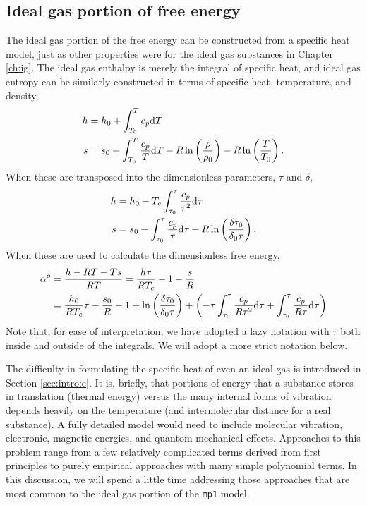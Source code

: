 \subsection{Ideal gas portion of free energy}
The ideal gas portion of the free energy can be constructed from a specific heat model, just as other properties were for the ideal gas substances in Chapter \ref{ch:ig}.  The ideal gas enthalpy is merely the integral of specific heat, and ideal gas entropy can be similarly constructed in terms of specific heat, temperature, and density,
\begin{subequations}
\begin{align}
h &= h_0 + \int_{T_0}^T c_p \mathrm{d} T\\
s &= s_0 + \int_{T_0}^T \frac{c_p}{T} \mathrm{d} T - R \ln\left(\frac{\rho}{\rho_0}\right) - R\ln\left(\frac{T}{T_0}\right).
\end{align}
\end{subequations}
When these are transposed into the dimensionless parameters, $\tau$ and $\delta$,
\begin{align*}
h &= h_0 - T_c \int_{\tau_0}^\tau \frac{c_p}{\tau^2} \mathrm{d} \tau\\
s &= s_0 - \int_{\tau_0}^\tau \frac{c_p}{\tau} \mathrm{d} \tau - R \ln\left(\frac{\delta \tau_0}{\delta_0 \tau}\right).
\end{align*}
When these are used to calculate the dimensionless free energy,
\begin{align}
\alpha^o &= \frac{h - RT - Ts}{RT} = \frac{h \tau}{R T_c} - 1 - \frac{s}{R}\nonumber\\
 &= \frac{h_0}{RT_c} \tau - \frac{s_0}{R} - 1 + \ln\left(\frac{\delta \tau_0}{\delta_0 \tau}\right) + \left(-\tau\int_{\tau_0}^\tau \frac{c_p}{R \tau^2} \mathrm{d} \tau + \int_{\tau_0}^\tau \frac{c_p}{R \tau} \mathrm{d} \tau \right)\label{eqn:mp1:aodef}
\end{align}
Note that, for ease of interpretation, we have adopted a lazy notation with $\tau$ both inside and outside of the integrals.  We will adopt a more strict notation below.

The difficulty in formulating the specific heat of even an ideal gas is introduced in Section \ref{sec:intro:e}.  It is, briefly, that portions of energy that a substance stores in translation (thermal energy) versus the many internal forms of vibration depends heavily on the temperature (and intermolecular distance for a real substance).  A fully detailed model would need to include molecular vibration, electronic, magnetic energies, and quantom mechanical effects.  Approaches to this problem range from a few relatively complicated terms derived from first principles to purely empirical approaches with many simple polynomial terms.  In this discussion, we will spend a little time addressing those approaches that are most common to the ideal gas portion of the \verb|mp1| model.

